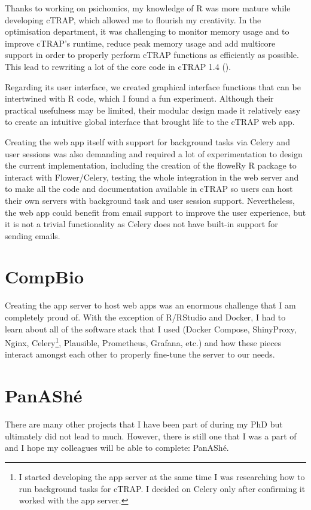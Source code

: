 Thanks to working on psichomics, my knowledge of R was more mature while developing cTRAP, which allowed me to flourish my creativity. In the optimisation department, it was challenging to monitor memory usage and to improve cTRAP's runtime, reduce peak memory usage and add multicore support in order to properly perform cTRAP functions as efficiently as possible. This lead to rewriting a lot of the core code in cTRAP 1.4 ().

Regarding its user interface, we created graphical interface functions that can be intertwined with R code, which I found a fun experiment. Although their practical usefulness may be limited, their modular design made it relatively easy to create an intuitive global interface that brought life to the cTRAP web app.

Creating the web app itself with support for background tasks via Celery and user sessions was also demanding and required a lot of experimentation to design the current implementation, including the creation of the floweRy R package to interact with Flower/Celery, testing the whole integration in the web server and to make all the code and documentation available in cTRAP so users can host their own servers with background task and user session support. Nevertheless, the web app could benefit from email support to improve the user experience, but it is not a trivial functionality as Celery does not have built-in support for sending emails.

\section{CompBio}

Creating the app server to host web apps was an enormous challenge that I am completely proud of. With the exception of R/RStudio and Docker, I had to learn about all of the software stack that I used (Docker Compose, ShinyProxy, Nginx, Celery\footnote{I started developing the app server at the same time I was researching how to run background tasks for cTRAP. I decided on Celery only after confirming it worked with the app server.}, Plausible, Prometheus, Grafana, etc.) and how these pieces interact amongst each other to properly fine-tune the server to our needs.

\section{PanAShé}

There are many other projects that I have been part of during my PhD but ultimately did not lead to much. However, there is still one that I was a part of and I hope my colleagues will be able to complete: PanAShé.

